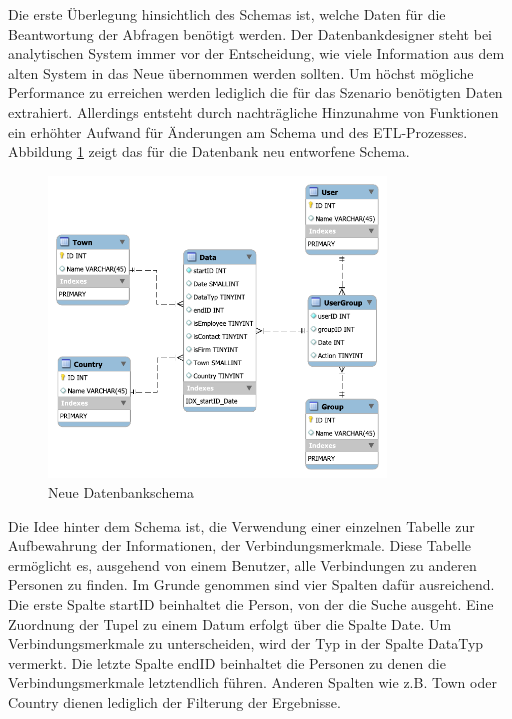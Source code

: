 Die erste Überlegung hinsichtlich des Schemas ist, welche Daten für die Beantwortung der Abfragen benötigt werden. Der Datenbankdesigner steht bei analytischen System immer vor der Entscheidung, wie viele Information aus dem alten System in das Neue übernommen werden sollten. Um höchst mögliche Performance zu erreichen werden lediglich die für das Szenario benötigten Daten extrahiert. Allerdings entsteht durch nachträgliche Hinzunahme von Funktionen ein erhöhter Aufwand für Änderungen am Schema und des ETL-Prozesses. Abbildung \ref{konzept_SchemaNeu} zeigt das für die Datenbank neu entworfene Schema. 

\begin{figure}[htbp]
\centering
  \includegraphics[width=0.8\textwidth, width=0.8\textwidth]{pics/NewSchema.pdf}
\caption{Neue Datenbankschema}
\label{konzept_SchemaNeu}
\end{figure} 

Die Idee hinter dem Schema ist, die Verwendung einer einzelnen Tabelle zur Aufbewahrung der Informationen, der Verbindungsmerkmale. Diese Tabelle ermöglicht es, ausgehend von einem Benutzer, alle Verbindungen zu anderen Personen zu finden. Im Grunde genommen sind vier Spalten dafür ausreichend. Die erste Spalte startID beinhaltet die Person, von der die Suche ausgeht. Eine Zuordnung der Tupel zu einem Datum erfolgt über die Spalte Date. Um Verbindungsmerkmale zu unterscheiden, wird der Typ in der Spalte DataTyp vermerkt. Die letzte Spalte endID beinhaltet die Personen zu denen die Verbindungsmerkmale letztendlich führen. Anderen Spalten wie z.B. Town oder Country dienen lediglich der Filterung der Ergebnisse.

